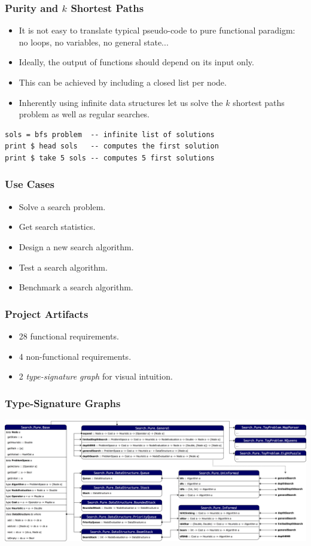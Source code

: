 \documentclass{beamer}
\begin{document}
\begin{frame}[fragile]
  \frametitle{Purity and $k$ Shortest Paths}
  \begin{itemize}
  \item It is not easy to translate typical pseudo-code to pure functional
    paradigm: no loops, no variables, no general state...
  \item Ideally, the output of functions should depend on its input only.
  \item This can be achieved by including a closed list per node.
  \item Inherently using infinite data structures let us solve the $k$ shortest
    paths problem as well as regular searches.
  \end{itemize}

\begin{lstlisting}[style=haskell]
sols = bfs problem  -- infinite list of solutions
print $ head sols   -- computes the first solution
print $ take 5 sols -- computes 5 first solutions
\end{lstlisting}
\end{frame}


\begin{frame}
  \frametitle{Use Cases}
  \begin{itemize}
  \item Solve a search problem.
  \item Get search statistics.
  \item Design a new search algorithm.
  \item Test a search algorithm.
  \item Benchmark a search algorithm.
  \end{itemize}
\end{frame}

\begin{frame}
  \frametitle{Project Artifacts}
  \begin{itemize}
  \item 28 functional requirements.
  \item 4 non-functional requirements.
  \item 2 \emph{type-signature graph} for visual intuition.
  \end{itemize}
\end{frame}

\begin{frame}
  \frametitle{Type-Signature Graphs}
  \includegraphics[width=\textwidth]{type-graph-pure.png}
\end{frame}
\end{document}
